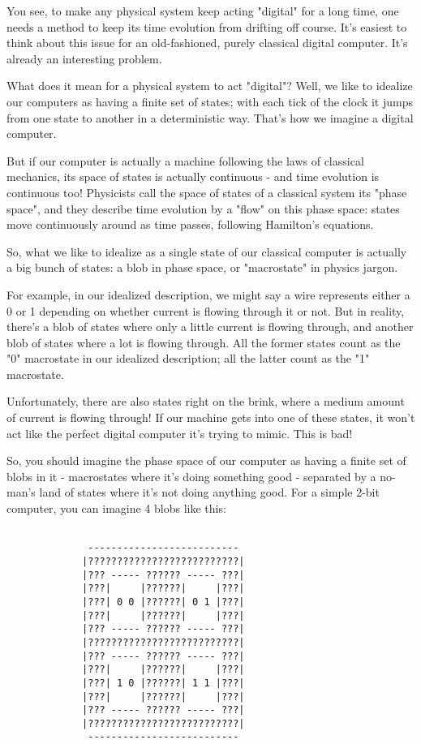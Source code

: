 You see, to make any physical system keep acting "digital" for a
long time, one needs a method to keep its time evolution from 
drifting off course.  It's easiest to think about this issue 
for an old-fashioned, purely classical digital computer.  It's 
already an interesting problem.  

What does it mean for a physical system to act "digital"?  Well,
we like to idealize our computers as having a finite set of states;
with each tick of the clock it jumps from one state to another in 
a deterministic way.  That's how we imagine a digital computer.

But if our computer is actually a machine following the laws of 
classical mechanics, its space of states is actually continuous - 
and time evolution is continuous too!  Physicists call the space 
of states of a classical system its "phase space", and they describe 
time evolution by a "flow" on this phase space: states move 
continuously around as time passes, following Hamilton's equations.

So, what we like to idealize as a single state of our classical
computer is actually a big bunch of states: a blob in phase space,
or "macrostate" in physics jargon.  

For example, in our idealized description, we might say a wire
represents either a 0 or 1 depending on whether current is 
flowing through it or not.  But in reality, there's a blob of 
states where only a little current is flowing through, and 
another blob of states where a lot is flowing through.  All 
the former states count as the "0" macrostate in our idealized 
description; all the latter count as the "1" macrostate.  

Unfortunately, there are also states right on the brink, where a 
medium amount of current is flowing through!  If our machine gets
into one of these states, it won't act like the perfect digital
computer it's trying to mimic.  This is bad!

So, you should imagine the phase space of our computer as having
a finite set of blobs in it - macrostates where it's doing something
good - separated by a no-man's land of states where it's not 
doing anything good.  For a simple 2-bit computer, you can imagine
4 blobs like this:


\begin{verbatim}

              --------------------------
             |??????????????????????????|
             |??? ----- ?????? ----- ???|
             |???|     |??????|     |???|
             |???| 0 0 |??????| 0 1 |???|
             |???|     |??????|     |???|
             |??? ----- ?????? ----- ???|
             |??????????????????????????|
             |??? ----- ?????? ----- ???|
             |???|     |??????|     |???|
             |???| 1 0 |??????| 1 1 |???|
             |???|     |??????|     |???|
             |??? ----- ?????? ----- ???|
             |??????????????????????????|
              --------------------------
\end{verbatim}
    
